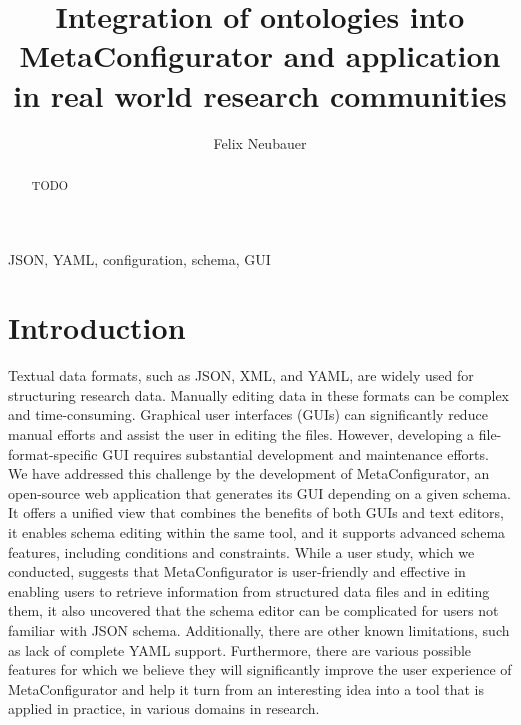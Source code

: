 \documentclass[lettersize,journal]{IEEEtran}
\begin{document}
 \title{Integration of ontologies into MetaConfigurator and application in real world research communities}
 \author{Felix Neubauer}



 \maketitle

 \begin{abstract}
 TODO
 \end{abstract}

 \begin{IEEEkeywords}
  JSON, YAML, configuration, schema, GUI
 \end{IEEEkeywords}


 \section{Introduction}\label{sec:introduction} %

Textual data formats, such as JSON, XML, and YAML, are widely used for structuring research data.
Manually editing data in these formats can be complex and time-consuming.
Graphical user interfaces (GUIs) can significantly reduce manual efforts and assist the user in editing the files.
However, developing a file-format-specific GUI requires substantial development and maintenance efforts.
We have addressed this challenge by the development of MetaConfigurator, an open-source web application that generates its GUI depending on a given schema.
It offers a unified view that combines the benefits of both GUIs and text editors, it enables schema editing within the same tool, and it supports advanced schema features, including conditions and constraints.
While a user study, which we conducted, suggests that MetaConfigurator is user-friendly and effective in enabling users to retrieve information from structured data files and in editing them, it also uncovered that the schema editor can be complicated for users not familiar with JSON schema.
Additionally, there are other known limitations, such as lack of complete YAML support. Furthermore, there are various possible features for which we believe they will significantly improve the user experience of MetaConfigurator and help it turn from an interesting idea into a tool that is applied in practice, in various domains in research.
\end{document}
